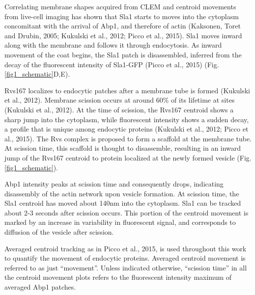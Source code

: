 \vspace{5mm}
Correlating membrane shapes acquired from CLEM and centroid movements from live-cell imaging has shown that Sla1 starts to moves into the cytoplasm concomitant with the arrival of Abp1, and therefore of actin (Kaksonen, Toret and Drubin, 2005; Kukulski et al., 2012; Picco et al., 2015). Sla1 moves inward along with the membrane and follows it through endocytosis. As inward movement of the coat begins, the Sla1 patch is disassembled, inferred from the decay of the fluorescent intensity of Sla1-GFP (Picco et al., 2015) (Fig.\ref{fig1_schematic}D,E). 

\vspace{5mm}
Rvs167 localizes to endocytic patches after a membrane tube is formed (Kukulski et al., 2012). Membrane scission occurs at around 60\% of its lifetime at sites (Kukulski et al., 2012). At the time of scission, the Rvs167 centroid shows a sharp jump into the cytoplasm, while fluorescent intensity shows a sudden decay, a profile that is unique among endocytic proteins (Kukulski et al., 2012; Picco et al., 2015). The Rvs complex is proposed to form a scaffold at the membrane tube. At scission time, this scaffold is thought to disassemble, resulting in an inward jump of the Rvs167 centroid to protein localized at the newly formed vesicle (Fig.\ref{fig1_schematic}). 

\vspace{5mm}
Abp1 intensity peaks at scission time and consequently drops, indicating disassembly of the actin network upon vesicle formation. At scission time, the Sla1 centroid has moved about 140nm into the cytoplasm. Sla1 can be tracked about 2-3 seconds after scission occurs. This portion of the centroid movement is marked by an increase in variability in fluorescent signal, and corresponds to diffusion of the vesicle after scission.


\vspace{5mm}
Averaged centroid tracking as in Picco et al., 2015, is used throughout this work to quantify the movement of endocytic proteins. Averaged centroid movement is referred to as just  “movement”. Unless indicated otherwise, “scission time” in all the centroid movement plots refers to the fluorescent intensity maximum of averaged Abp1 patches.


